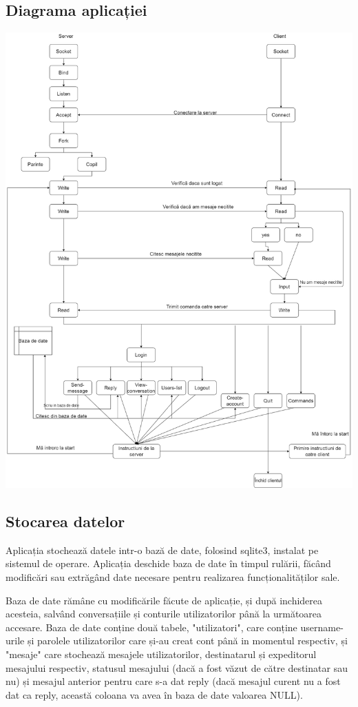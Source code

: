 \documentclass[a4paper,12pt]{article}
\begin{document}
\subsection{Diagrama aplicației}

\begin{center}
\includegraphics[width=1.1\textwidth]{Diagrama.png}
\end{center}

\subsection{Stocarea datelor}
\tab
Aplicația stochează datele intr-o bază de date, folosind sqlite3, instalat pe sistemul de operare. Aplicația deschide baza de date în timpul rulării, făcând modificări sau extrăgând date necesare pentru realizarea funcționalităților sale. 

Baza de date rămâne cu modificările făcute de aplicație, și după inchiderea acesteia, salvând conversațiile și conturile utilizatorilor până la următoarea accesare. Baza de date conține două tabele, "utilizatori", care conține username-urile și parolele utilizatorilor care și-au creat cont până in momentul respectiv, și "mesaje" care stochează mesajele utilizatorilor, destinatarul și expeditorul mesajului respectiv, statusul mesajului (dacă a fost văzut de către destinatar sau nu) și mesajul anterior pentru care s-a dat reply (dacă mesajul curent nu a fost dat ca reply, această coloana va avea în baza de date valoarea NULL).
    
\end{document}
